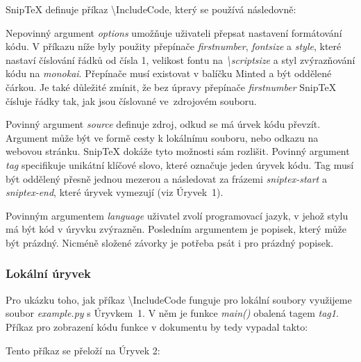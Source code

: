 \documentclass{article}
\begin{document}
Snip\TeX{} definuje příkaz \textbackslash{}IncludeCode, který se používá následovně:


Nepovinný argument \textit{options} umožňuje uživateli přepsat nastavení formátování kódu. 
V příkazu níže byly použity přepínače \textit{firstnumber}, \textit{fontsize} a \textit{style},
které nastaví číslování řádků od čísla 1, velikost fontu na \nobreak\textit{\textbackslash{}scriptsize}
a styl zvýrazňování kódu na \textit{monokai}. 
Přepínače musí existovat v balíčku Minted \citep{minted} a být oddělené čárkou. Je také důležité zmínit, že bez úpravy
přepínače \textit{firstnumber} Snip\TeX{} čísluje řádky tak, jak jsou číslované ve~zdrojovém souboru.


Povinný argument \textit{source} definuje zdroj, odkud se má
úrvek kódu převzít. Argument může být ve formě cesty k lokálnímu souboru, nebo odkazu na webovou stránku.
Snip\TeX{} dokáže tyto možnosti sám rozlišit. Povinný argument \textit{tag} specifikuje 
unikátní klíčové slovo, které označuje jeden úryvek kódu. Tag musí být oddělený přesně jednou mezerou a 
následovat za frázemi \textit{sniptex-start} a \textit{sniptex-end}, 
které úryvek vymezují (viz Úryvek~1).


Povinným argumentem \textit{language} uživatel zvolí programovací jazyk, v jehož stylu má 
být kód v úryvku zvýrazněn. Posledním argumentem je popisek, který může být prázdný. 
Nicméně složené závorky je potřeba psát i pro prázdný popisek.

\subsubsection*{Lokální úryvek}

Pro ukázku toho, jak příkaz \textbackslash{}IncludeCode funguje pro lokální soubory využijeme
soubor \textit{example.py} s Úryvkem~1. V něm je funkce \textit{main()} obalená tagem \textit{tag1}. 
Příkaz pro zobrazení kódu funkce v dokumentu by tedy vypadal takto:


Tento příkaz se přeloží na Úryvek 2:

\end{document}
